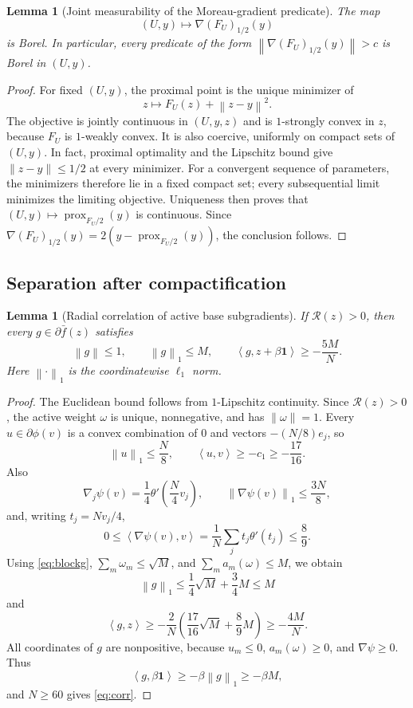 \documentclass[11pt,a4paper]{article}
\newcommand{\one}{\mathbf 1}
\newcommand{\norm}[1]{\left\lVert #1\right\rVert}
\newcommand{\inner}[2]{\left\langle #1,#2\right\rangle}
\DeclareMathOperator{\prox}{prox}
\newtheorem{lemma}[theorem]{Lemma}
\theoremstyle{definition}
\numberwithin{equation}{section}
\begin{document}
\begin{lemma}[Joint measurability of the Moreau-gradient predicate]\label{lem:moreau-borel}
The map
\[
 (U,y)\longmapsto \nabla(F_U)_{1/2}(y)
\]
is Borel.  In particular, every predicate of the form
$\norm{\nabla(F_U)_{1/2}(y)}>c$ is Borel in $(U,y)$.
\end{lemma}

\begin{proof}
For fixed $(U,y)$, the proximal point is the unique minimizer of
\[
 z\longmapsto F_U(z)+\norm{z-y}^2.
\]
The objective is jointly continuous in $(U,y,z)$ and is $1$-strongly convex in $z$, because $F_U$ is $1$-weakly convex.  It is also coercive, uniformly on compact sets of $(U,y)$.  In fact, proximal optimality and the Lipschitz bound give
$\|z-y\|\le1/2$ at every minimizer. For a convergent sequence of parameters,
the minimizers therefore lie in a fixed compact set; every subsequential
limit minimizes the limiting objective. Uniqueness then proves that
$(U,y)\mapsto\prox_{F_U/2}(y)$ is continuous.  Since
$\nabla(F_U)_{1/2}(y)=2(y-\prox_{F_U/2}(y))$, the conclusion follows.
\end{proof}

\subsection{Separation after compactification}\label{sec:separation}

\begin{lemma}[Radial correlation of active base subgradients]\label{lem:correlation}
If $\mathcal R(z)>0$, then every $g\in\partial\bar f(z)$ satisfies
\begin{equation}\label{eq:corr}
 \norm g\le1,
 \qquad
 \norm g_1\le M,
 \qquad
 \inner{g}{z+\beta\one}\ge-\frac{5M}{N}.
\end{equation}
Here $\norm\cdot_1$ is the coordinatewise $\ell_1$ norm.
\end{lemma}

\begin{proof}
The Euclidean bound follows from $1$-Lipschitz continuity.  Since $\mathcal R(z)>0$, the active weight $\omega$ is unique, nonnegative, and has $\norm\omega=1$.
Every $u\in\partial\phi(v)$ is a convex combination of $0$ and vectors $-(N/8)e_j$, so
\[
 \norm u_1\le\frac N8,
 \qquad
 \inner{u}{v}\ge-c_1\ge-\frac{17}{16}.
\]
Also
\[
 \nabla_j\psi(v)=\frac14\theta'\!\left(\frac N4v_j\right),
 \qquad
 \norm{\nabla\psi(v)}_1\le\frac{3N}{8},
\]
and, writing $t_j=Nv_j/4$,
\[
 0\le\inner{\nabla\psi(v)}{v}
 =\frac1N\sum_jt_j\theta'(t_j)\le\frac89.
\]
Using \eqref{eq:blockg}, $\sum_m\omega_m\le\sqrt M$, and $\sum_ma_m(\omega)\le M$, we obtain
\[
 \norm g_1\le\frac14\sqrt M+\frac34M\le M
\]
and
\[
 \inner{g}{z}
 \ge-\frac2N\left(\frac{17}{16}\sqrt M+\frac89M\right)
 \ge-\frac{4M}{N}.
\]
All coordinates of $g$ are nonpositive, because $u_m\le0$, $a_m(\omega)\ge0$, and $\nabla\psi\ge0$.  Thus
\[
 \inner{g}{\beta\one}\ge-\beta\norm g_1\ge-\beta M,
\]
and $N\ge60$ gives \eqref{eq:corr}.
\end{proof}
\end{document}
